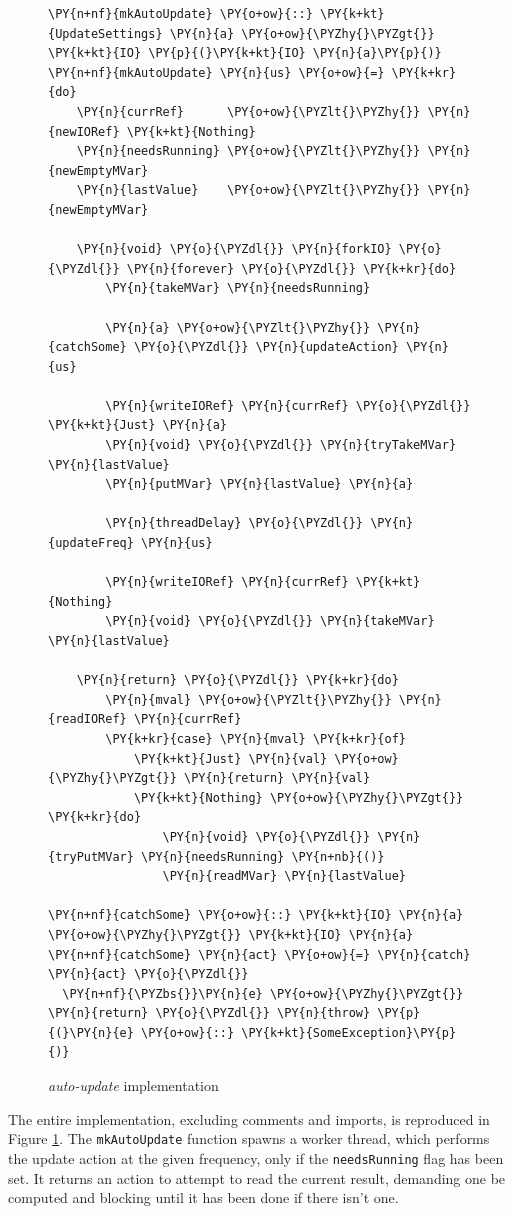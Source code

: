 \begin{figure}[t]
\begin{Verbatim}[commandchars=\\\{\}]
\PY{n+nf}{mkAutoUpdate} \PY{o+ow}{::} \PY{k+kt}{UpdateSettings} \PY{n}{a} \PY{o+ow}{\PYZhy{}\PYZgt{}} \PY{k+kt}{IO} \PY{p}{(}\PY{k+kt}{IO} \PY{n}{a}\PY{p}{)}
\PY{n+nf}{mkAutoUpdate} \PY{n}{us} \PY{o+ow}{=} \PY{k+kr}{do}
    \PY{n}{currRef}      \PY{o+ow}{\PYZlt{}\PYZhy{}} \PY{n}{newIORef} \PY{k+kt}{Nothing}
    \PY{n}{needsRunning} \PY{o+ow}{\PYZlt{}\PYZhy{}} \PY{n}{newEmptyMVar}
    \PY{n}{lastValue}    \PY{o+ow}{\PYZlt{}\PYZhy{}} \PY{n}{newEmptyMVar}

    \PY{n}{void} \PY{o}{\PYZdl{}} \PY{n}{forkIO} \PY{o}{\PYZdl{}} \PY{n}{forever} \PY{o}{\PYZdl{}} \PY{k+kr}{do}
        \PY{n}{takeMVar} \PY{n}{needsRunning}

        \PY{n}{a} \PY{o+ow}{\PYZlt{}\PYZhy{}} \PY{n}{catchSome} \PY{o}{\PYZdl{}} \PY{n}{updateAction} \PY{n}{us}

        \PY{n}{writeIORef} \PY{n}{currRef} \PY{o}{\PYZdl{}} \PY{k+kt}{Just} \PY{n}{a}
        \PY{n}{void} \PY{o}{\PYZdl{}} \PY{n}{tryTakeMVar} \PY{n}{lastValue}
        \PY{n}{putMVar} \PY{n}{lastValue} \PY{n}{a}

        \PY{n}{threadDelay} \PY{o}{\PYZdl{}} \PY{n}{updateFreq} \PY{n}{us}

        \PY{n}{writeIORef} \PY{n}{currRef} \PY{k+kt}{Nothing}
        \PY{n}{void} \PY{o}{\PYZdl{}} \PY{n}{takeMVar} \PY{n}{lastValue}

    \PY{n}{return} \PY{o}{\PYZdl{}} \PY{k+kr}{do}
        \PY{n}{mval} \PY{o+ow}{\PYZlt{}\PYZhy{}} \PY{n}{readIORef} \PY{n}{currRef}
        \PY{k+kr}{case} \PY{n}{mval} \PY{k+kr}{of}
            \PY{k+kt}{Just} \PY{n}{val} \PY{o+ow}{\PYZhy{}\PYZgt{}} \PY{n}{return} \PY{n}{val}
            \PY{k+kt}{Nothing} \PY{o+ow}{\PYZhy{}\PYZgt{}} \PY{k+kr}{do}
                \PY{n}{void} \PY{o}{\PYZdl{}} \PY{n}{tryPutMVar} \PY{n}{needsRunning} \PY{n+nb}{()}
                \PY{n}{readMVar} \PY{n}{lastValue}

\PY{n+nf}{catchSome} \PY{o+ow}{::} \PY{k+kt}{IO} \PY{n}{a} \PY{o+ow}{\PYZhy{}\PYZgt{}} \PY{k+kt}{IO} \PY{n}{a}
\PY{n+nf}{catchSome} \PY{n}{act} \PY{o+ow}{=} \PY{n}{catch} \PY{n}{act} \PY{o}{\PYZdl{}}
  \PY{n+nf}{\PYZbs{}}\PY{n}{e} \PY{o+ow}{\PYZhy{}\PYZgt{}} \PY{n}{return} \PY{o}{\PYZdl{}} \PY{n}{throw} \PY{p}{(}\PY{n}{e} \PY{o+ow}{::} \PY{k+kt}{SomeException}\PY{p}{)}
\end{Verbatim}
  \caption{\textit{auto-update} implementation}
  \label{fig:dejafu-example-autoupdate}
\end{figure}

The entire implementation, excluding comments and imports, is
reproduced in Figure \ref{fig:dejafu-example-autoupdate}. The
\texttt{mkAutoUpdate} function spawns a worker thread, which performs
the update action at the given frequency, only if the
\texttt{needsRunning} flag has been set. It returns an action to
attempt to read the current result, demanding one be computed and
blocking until it has been done if there isn't one.

